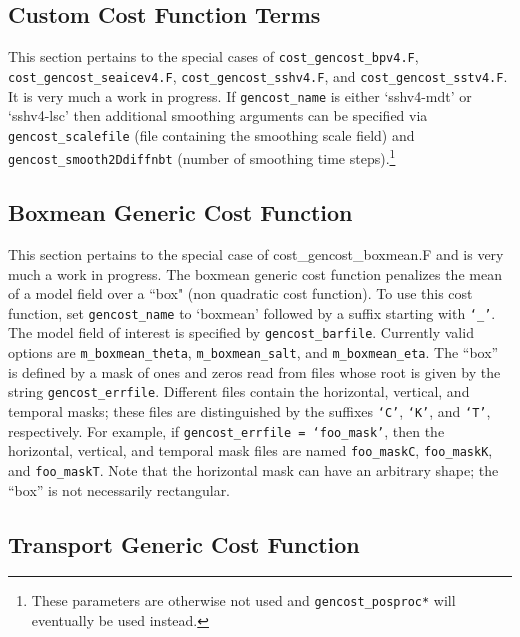 \clearpage

\subsection{Custom Cost Function Terms} \label{v4custom}

This section pertains to the special cases of \texttt{cost\_gencost\_bpv4.F}, \texttt{cost\_gencost\_seaicev4.F}, \texttt{cost\_gencost\_sshv4.F}, and \texttt{cost\_gencost\_sstv4.F}. It is very much a work in progress. If \texttt{gencost\_name} is either `sshv4-mdt' or `sshv4-lsc' then additional smoothing arguments can be specified via \texttt{gencost\_scalefile} (file containing the smoothing scale field) and \texttt{gencost\_smooth2Ddiffnbt} (number of smoothing time steps).\footnote{These parameters are otherwise not used and \texttt{gencost\_posproc*} will eventually be used instead.}

\subsection{Boxmean Generic Cost Function} \label{genboxmean}

This section pertains to the special case of cost\_gencost\_boxmean.F and is very much a work in progress. The boxmean generic cost function penalizes the mean of a model field over a ``box" (non quadratic cost function). To use this cost function, set \texttt{gencost\_name} to `boxmean' followed by a suffix starting with \texttt{`\_'}. The model field of interest is specified by \texttt{gencost\_barfile}. Currently valid options are \texttt{m\_boxmean\_theta}, \texttt{m\_boxmean\_salt}, and \texttt{m\_boxmean\_eta}. The ``box'' is defined by a mask of ones and zeros read from files whose root is given by the string \texttt{gencost\_errfile}. Different files contain the horizontal, vertical, and temporal masks; these files are distinguished by the suffixes \texttt{`C'}, \texttt{`K'}, and \texttt{`T'}, respectively. For example, if \texttt{gencost\_errfile = `foo\_mask'}, then the horizontal, vertical, and temporal mask files are named \texttt{foo\_maskC}, \texttt{foo\_maskK}, and \texttt{foo\_maskT}. Note that the horizontal mask can have an arbitrary shape; the ``box'' is not necessarily rectangular.

\subsection{Transport Generic Cost Function} \label{gentrsp}

